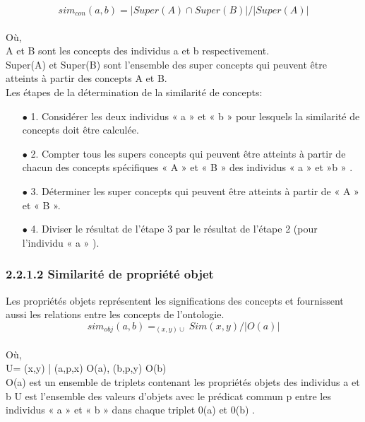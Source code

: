 			$$ sim_{con}(a,b) = | Super(A) \cap Super(B) | / | Super(A) |$$\\

            Où,\\
            A et B sont les concepts des individus a et b respectivement.\\
            Super(A) et Super(B) sont l’ensemble des super concepts qui peuvent être atteints à partir des concepts A et B.\\
            Les étapes de la détermination de la similarité de concepts:
                 \begin{itemize}
                    \item[\quad $\bullet$] 1. Considérer les deux individus « a » et « b » pour lesquels la similarité de concepts doit être calculée.
                    \item[\quad $\bullet$] 2. Compter tous les supers concepts qui peuvent être atteints à partir de chacun des concepts spécifiques « A » et « B » des individus « a » et »b » .
                    \item[\quad $\bullet$] 3. Déterminer les super concepts qui peuvent être atteints à partir de « A » et « B ».
    	           \item[\quad $\bullet$] 4. Diviser le résultat de l’étape 3 par le résultat de l’étape 2 (pour l’individu « a » ).
                 \end{itemize}


    \subsubsection{2.2.1.2 Similarité de propriété objet}
        Les propriétés objets représentent les significations des concepts et fournissent aussi les relations entre les concepts de l’ontologie.\\


        $$ sim_{obj}(a,b)=_{(x,y)\cup}Sim(x,y)/|O(a)|$$\\

        Où,\\
        U={ (x,y) | (a,p,x)   O(a), (b,p,y)     O(b) }\\
        O(a)  est un ensemble de triplets contenant les propriétés objets des individus a et b
        U  est l’ensemble des valeurs d’objets avec le prédicat commun p entre les individus « a » et « b » dans chaque triplet 0(a) et 0(b) .\\

